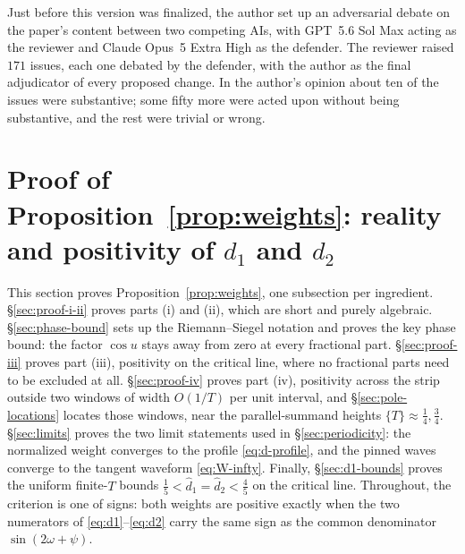 \documentclass[11pt]{article}
\theoremstyle{definition}
\begin{document}
Just before this version was finalized, the author set up an adversarial
debate on the paper's content between two competing AIs, with GPT~5.6 Sol Max
acting as the reviewer and Claude Opus~5 Extra High as the defender. The
reviewer raised $171$ issues, each one debated by the defender, with the
author as the final adjudicator of every proposed change. In the author's
opinion about ten of the issues were substantive; some fifty more were acted
upon without being substantive, and the rest were trivial or wrong.

\clearpage

\appendix

\clearpage

\section{Proof of Proposition~\texorpdfstring{\ref{prop:weights}}{4.1}: reality and positivity of \texorpdfstring{$d_1$ and $d_2$}{d1 and d2}}\label{sec:positivity}

This section proves Proposition~\ref{prop:weights}, one subsection per
ingredient. \S\ref{sec:proof-i-ii} proves parts (i) and (ii), which are
short and purely algebraic. \S\ref{sec:phase-bound} sets up the
Riemann--Siegel notation and proves the key phase bound: the factor
$\cos u$ stays away from zero at every fractional part.
\S\ref{sec:proof-iii} proves part (iii), positivity on the critical
line, where no fractional parts need to be excluded at all.
\S\ref{sec:proof-iv} proves part (iv), positivity across the strip
outside two windows of width $O(1/T)$ per unit interval, and
\S\ref{sec:pole-locations} locates those windows, near the
parallel-summand heights $\{T\}\approx\tfrac14,\tfrac34$.
\S\ref{sec:limits} proves the two limit statements used in
\S\ref{sec:periodicity}: the normalized weight converges to the profile
\eqref{eq:d-profile}, and the pinned waves converge to the tangent
waveform \eqref{eq:W-infty}. Finally, \S\ref{sec:d1-bounds} proves the
uniform finite-$T$ bounds $\tfrac15<\hat d_1=\hat d_2<\tfrac45$ on the
critical line. Throughout, the
criterion is one of signs: both weights are positive exactly when the two
numerators of \eqref{eq:d1}--\eqref{eq:d2} carry the same sign as the
common denominator $\sin(2\omega+\psi)$.
\end{document}
